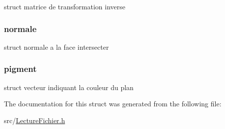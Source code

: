 \label{structplane_acd7a3590501dcccfaefccbb658f83821}
struct matrice de transformation inverse \hypertarget{structplane_a944738f40a0294270a0047acc5a77ee2}{
\subsubsection[{normale}]{ {\bf normale}}}
\label{structplane_a944738f40a0294270a0047acc5a77ee2}
struct normale a la face intersecter \hypertarget{structplane_a5a4ee24431a1811fa1c8b75844198987}{
\subsubsection[{pigment}]{ {\bf pigment}}}
\label{structplane_a5a4ee24431a1811fa1c8b75844198987}
struct vecteur indiquant la couleur du plan 

The documentation for this struct was generated from the following file:\begin{DoxyCompactItemize}
\item 
src/\hyperlink{_lecture_fichier_8h}{LectureFichier.h}\end{DoxyCompactItemize}
